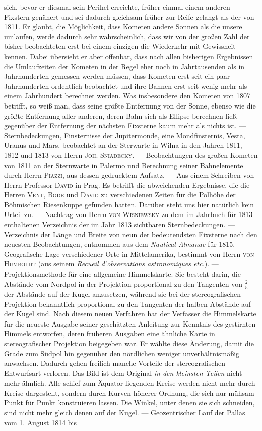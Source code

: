 sich, bevor er diesmal sein Perihel erreichte, früher einmal einem anderen Fixstern genähert und sei dadurch gleichsam früher zur Reife gelangt als der von 1811. Er glaubt, die Möglichkeit, dass Kometen andere Sonnen als die unsere umlaufen, werde dadurch sehr wahrscheinlich, dass wir von der großen Zahl der bisher beobachteten erst bei einem einzigen die Wiederkehr mit Gewissheit kennen. Dabei übersieht er aber offenbar, dass nach allen bisherigen Ergebnissen die Umlaufzeiten der Kometen in der Regel eher noch in Jahrtausenden als in Jahrhunderten gemessen werden müssen, dass Kometen erst seit ein paar Jahrhunderten ordentlich beobachtet und ihre Bahnen erst seit wenig mehr als einem Jahrhundert berechnet werden. Was insbesondere den Kometen von 1807 betrifft, so weiß man, dass seine größte Entfernung von der Sonne, ebenso wie die größte Entfernung aller anderen, deren Bahn sich als Ellipse berechnen ließ, gegenüber der Entfernung der nächsten Fixsterne kaum mehr als nichts ist. — Sternbedeckungen, Finsternisse der Jupitermonde, eine Mondfinsternis, Vesta, Uranus und Mars, beobachtet an der Sterwarte in Wilna in den Jahren 1811, 1812 und 1813 von Herrn \textsc{Joh. Sniadecky}. — Beobachtungen des großen Kometen von 1811 an der Sternwarte in Palermo und Berechnung seiner Bahnelemente durch Herrn \textsc{Piazzi}, aus dessen gedrucktem Aufsatz. — Aus einem Schreiben von Herrn Professor \textsc{David} in Prag. Es betrifft die abweichenden Ergebnisse, die die Herren \textsc{Vent}, \textsc{Bode} und \textsc{David} zu verschiedenen Zeiten für die Polhöhe der Böhmischen Riesenkuppe gefunden hatten. Darüber steht uns hier natürlich kein Urteil zu. — Nachtrag von Herrn \textsc{von Wisniewsky} zu dem im Jahrbuch für 1813 enthaltenen Verzeichnis der im Jahr 1813 sichtbaren Sternbedeckungen. — Verzeichnis der Länge und Breite von neun der bedeutendsten Fixsterne nach den neuesten Beobachtungen, entnommen aus dem \emph{Nautical Almanac} für 1815. — Geografische Lage verschiedener Orte in Mittelamerika, bestimmt von Herrn \textsc{von Humboldt} (aus seinem \emph{Recueil d'observations astronomiques etc.}). — Projektionsmethode für eine allgemeine Himmelskarte. Sie besteht darin, die Abstände vom Nordpol in der Projektion proportional zu den Tangenten von $\frac{2}{5}$ der Abstände auf der Kugel anzusetzen, während sie bei der stereografischen Projektion bekanntlich proportional zu den Tangenten der halben Abstände auf der Kugel sind. Nach diesem neuen Verfahren hat der Verfasser die Himmelskarte für die neueste Ausgabe seiner geschätzten Anleitung zur Kenntnis des gestirnten Himmels entworfen, deren früheren Ausgaben eine ähnliche Karte in stereografischer Projektion beigegeben war. Er wählte diese Änderung, damit die Grade zum Südpol hin gegenüber den nördlichen weniger unverhältnismäßig anwachsen. Dadurch gehen freilich manche Vorteile der stereografischen Entwurfsart verloren. Das Bild ist dem Original \emph{in den kleinsten Teilen} nicht mehr ähnlich. Alle schief zum Äquator liegenden Kreise werden nicht mehr durch Kreise dargestellt, sondern durch Kurven höherer Ordnung, die sich nur mühsam Punkt für Punkt konstruieren lassen. Die Winkel, unter denen sie sich schneiden, sind nicht mehr gleich denen auf der Kugel. — Geozentrischer Lauf der Pallas vom 1. August 1814 bis 